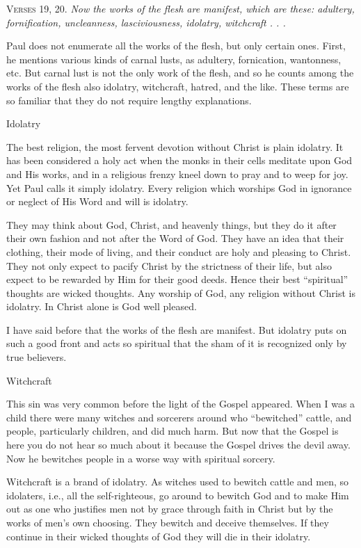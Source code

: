 \textsc{Verses} 19, 20. \emph{Now the works of the flesh are manifest, which are these: adultery, fornification, uncleanness, lasciviousness, idolatry, witchcraft . . .}

Paul does not enumerate all the works of the flesh, but only certain ones. First, he mentions various kinds of carnal lusts, as adultery, fornication, wantonness, etc. But carnal lust is not the only work of the flesh, and so he counts among the works of the flesh also idolatry, witchcraft, hatred, and the like. These terms are so familiar that they do not require lengthy explanations.

Idolatry

The best religion, the most fervent devotion without Christ is plain idolatry. It has been considered a holy act when the monks in their cells meditate upon God and His works, and in a religious frenzy kneel down to pray and to weep for joy. Yet Paul calls it simply idolatry. Every religion which worships God in ignorance or neglect of His Word and will is idolatry.

They may think about God, Christ, and heavenly things, but they do it after their own fashion and not after the Word of God. They have an idea that their clothing, their mode of living, and their conduct are holy and pleasing to Christ. They not only expect to pacify Christ by the strictness of their life, but also expect to be rewarded by Him for their good deeds. Hence their best “spiritual” thoughts are wicked thoughts. Any worship of God, any religion without Christ is idolatry. In Christ alone is God well pleased.

I have said before that the works of the flesh are manifest. But idolatry puts on such a good front and acts so spiritual that the sham of it is recognized only by true believers.

Witchcraft

This sin was very common before the light of the Gospel appeared. When I was a child there were many witches and sorcerers around who “bewitched” cattle, and people, particularly children, and did much harm. But now that the Gospel is here you do not hear so much about it because the Gospel drives the devil away. Now he bewitches people in a worse way with spiritual sorcery.

Witchcraft is a brand of idolatry. As witches used to bewitch cattle and men, so idolaters, i.e., all the self-righteous, go around to bewitch God and to make Him out as one who justifies men not by grace through faith in Christ but by the works of men’s own choosing. They bewitch and deceive themselves. If they continue in their wicked thoughts of God they will die in their idolatry.

